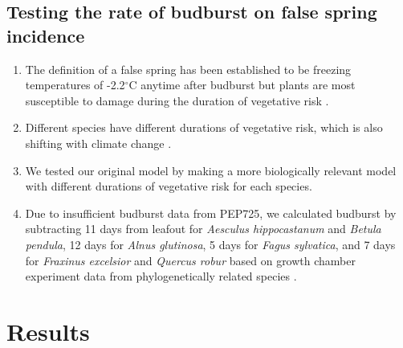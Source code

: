 \documentclass{article}\usepackage[]{graphicx}\usepackage[]{color}
\begin{document}
\subsection*{Testing the rate of budburst on false spring incidence}
\begin{enumerate}
\item The definition of a false spring has been established to be freezing temperatures of -2.2$^{\circ}$C \citep{Schwartz1993} anytime after budburst but plants are most susceptible to damage during the duration of vegetative risk \citep{Augspurger2013, Lenz2016}.
\item Different species have different durations of vegetative risk, which is also shifting with climate change \citep{Cleland2006, Fu2015, Xin2016}.%
\item We tested our original model by making a more biologically relevant model with different durations of vegetative risk for each species. 
\item Due to insufficient budburst data from PEP725, we calculated budburst by subtracting 11 days from leafout for \textit{Aesculus hippocastanum} and \textit{Betula pendula}, 12 days for \textit{Alnus glutinosa}, 5 days for \textit{Fagus sylvatica}, and 7 days for \textit{Fraxinus excelsior} and \textit{Quercus robur} based on growth chamber experiment data from phylogenetically related species \citep{Buerki2010, Wang2016, Hipp2017, Flynn2018}.
\end{enumerate}

\section*{Results}
\end{document}
